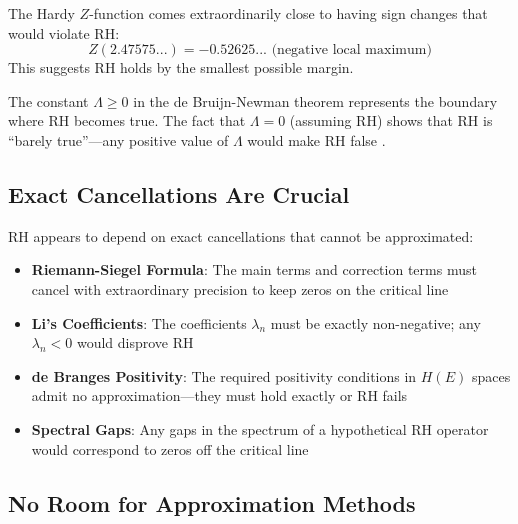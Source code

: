 \begin{example}
The Hardy $Z$-function comes extraordinarily close to having sign changes that would violate RH:
\begin{equation}
Z(2.47575...) = -0.52625... \text{ (negative local maximum)}
\end{equation}
This suggests RH holds by the smallest possible margin.
\end{example}

\begin{example}
The constant $\Lambda \geq 0$ in the de Bruijn-Newman theorem represents the boundary where RH becomes true. The fact that $\Lambda = 0$ (assuming RH) shows that RH is ``barely true''—any positive value of $\Lambda$ would make RH false \cite{rodgerstao2020}.
\end{example}

\subsection{Exact Cancellations Are Crucial}
\label{subsec:exact_cancellations}

RH appears to depend on exact cancellations that cannot be approximated:

\begin{itemize}
\item \textbf{Riemann-Siegel Formula}: The main terms and correction terms must cancel with extraordinary precision to keep zeros on the critical line

\item \textbf{Li's Coefficients}: The coefficients $\lambda_n$ must be exactly non-negative; any $\lambda_n < 0$ would disprove RH

\item \textbf{de Branges Positivity}: The required positivity conditions in $H(E)$ spaces admit no approximation—they must hold exactly or RH fails

\item \textbf{Spectral Gaps}: Any gaps in the spectrum of a hypothetical RH operator would correspond to zeros off the critical line
\end{itemize}

\subsection{No Room for Approximation Methods}
\label{subsec:no_approximation}

